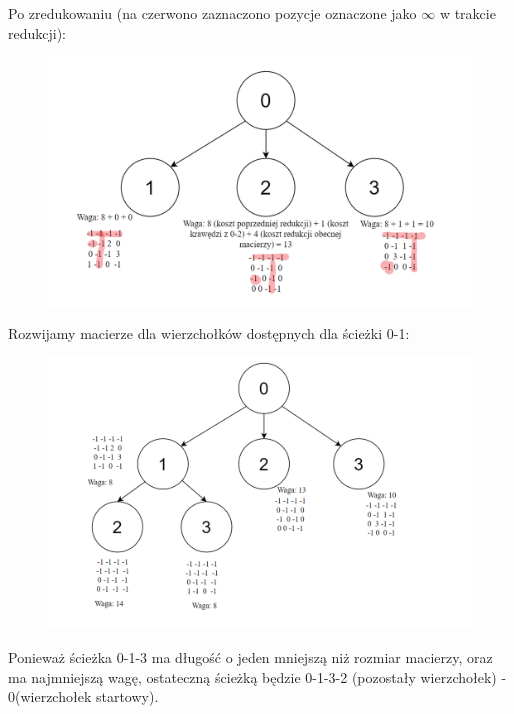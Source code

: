 \documentclass{article}
\begin{document}
\newline

\begin{center}
Po zredukowaniu (na czerwono zaznaczono pozycje oznaczone jako $\infty$ w trakcie redukcji):    
\end{center}


\begin{figure}[h]
    \centering
    \includegraphics[scale=0.4]{img/graf2.png}
\end{figure}

\newpage
\begin{center}
Rozwijamy macierze dla wierzchołków dostępnych dla ścieżki 0-1:    
\end{center}
\begin{figure}[h]
    \centering
    \includegraphics[scale=0.292]{img/graf3.png}
\end{figure}

\begin{center}
    Ponieważ ścieżka 0-1-3 ma długość o jeden mniejszą niż rozmiar macierzy, oraz ma najmniejszą wagę, ostateczną ścieżką będzie 0-1-3-2 (pozostały wierzchołek) - 0(wierzchołek startowy).
\end{center}
\end{document}
